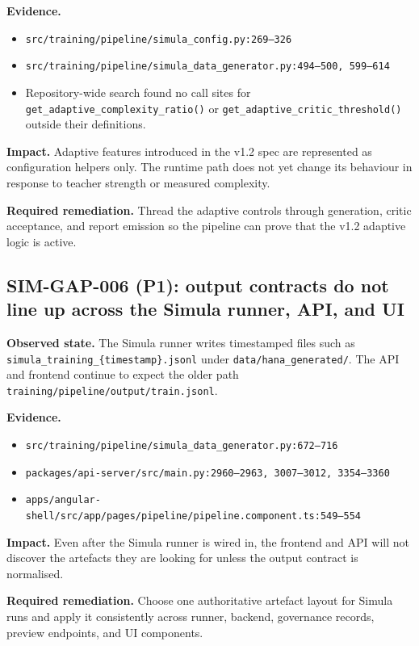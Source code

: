 \textbf{Evidence.}
\begin{itemize}
  \item \texttt{src/training/pipeline/simula\_config.py:269--326}
  \item \texttt{src/training/pipeline/simula\_data\_generator.py:494--500, 599--614}
  \item Repository-wide search found no call sites for
    \texttt{get\_adaptive\_complexity\_ratio()} or
    \texttt{get\_adaptive\_critic\_threshold()} outside their
    definitions.
\end{itemize}

\textbf{Impact.}
Adaptive features introduced in the v1.2 spec are represented as
configuration helpers only. The runtime path does not yet change its
behaviour in response to teacher strength or measured complexity.

\textbf{Required remediation.}
Thread the adaptive controls through generation, critic acceptance,
and report emission so the pipeline can prove that the v1.2 adaptive
logic is active.

\subsection*{SIM-GAP-006 (P1): output contracts do not line up across the Simula runner, API, and UI}
\textbf{Observed state.}
The Simula runner writes timestamped files such as
\texttt{simula\_training\_\{timestamp\}.jsonl} under
\texttt{data/hana\_generated/}. The API and frontend continue to
expect the older path \texttt{training/pipeline/output/train.jsonl}.

\textbf{Evidence.}
\begin{itemize}
  \item \texttt{src/training/pipeline/simula\_data\_generator.py:672--716}
  \item \texttt{packages/api-server/src/main.py:2960--2963,
    3007--3012, 3354--3360}
  \item \texttt{apps/angular-shell/src/app/pages/pipeline/pipeline.component.ts:549--554}
\end{itemize}

\textbf{Impact.}
Even after the Simula runner is wired in, the frontend and API will
not discover the artefacts they are looking for unless the output
contract is normalised.

\textbf{Required remediation.}
Choose one authoritative artefact layout for Simula runs and apply it
consistently across runner, backend, governance records, preview
endpoints, and UI components.

